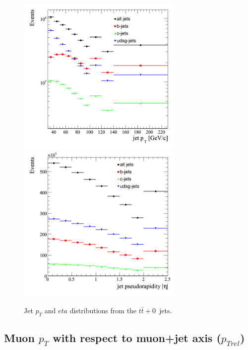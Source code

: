 \begin{figure}[htbp]
  \begin{center}
    \includegraphics[width=80mm]{Figures/jet_pt_tt0j.png}
    \includegraphics[width=80mm]{Figures/jet_eta_tt0j.png}
  \end{center}
  \caption{Jet $p_T$ and $eta$ distributions from the $t\bar{t}+0$~jets.}
  \label{fig:jet_pt_ttbar}
\end{figure}

\clearpage

\subsection{Muon $p_T$ with respect to muon+jet axis ($p_{Trel}$)}

